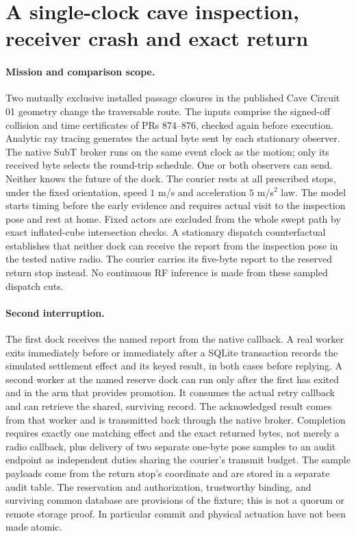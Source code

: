 \documentclass{article}
\begin{document}
\section*{A single-clock cave inspection, receiver crash and exact return}

\paragraph{Mission and comparison scope.}
Two mutually exclusive installed passage closures in the published Cave
Circuit 01 geometry change the traversable route. The inputs comprise the
signed-off collision and time certificates of PRs 874--876, checked
again before execution. Analytic ray tracing generates the actual byte
sent by each stationary observer. The native SubT broker runs on the same
event clock as the motion; only its received byte selects the round-trip
schedule. One or both observers can send. Neither knows the future of
the dock. The courier rests at all prescribed stops, under the fixed
orientation, speed $1$ m/s and acceleration $5$ m/s$^2$ law. The model
starts timing before the early evidence and requires actual visit to the
inspection pose and rest at home. Fixed actors are excluded from the
whole swept path by exact inflated-cube intersection checks. A stationary
dispatch counterfactual establishes that neither dock can receive the
report from the inspection pose in the tested native radio. The courier
carries its five-byte report to the reserved return stop instead.
No continuous RF inference is made from these sampled dispatch cuts.

\paragraph{Second interruption.}
The first dock receives the named report from the native callback. A
real worker exits immediately before or immediately after a SQLite
transaction records the simulated settlement effect and its keyed
result, in both cases before replying. A second worker at the named
reserve dock can run only after the first has exited and in the arm that
provides promotion. It consumes the actual retry callback and can
retrieve the shared, surviving record. The acknowledged result comes
from that worker and is transmitted back through the native broker.
Completion requires exactly one matching effect and the exact returned
bytes, not merely a radio callback, plus delivery of two separate
one-byte pose samples to an audit endpoint as independent duties
sharing the courier's transmit budget. The sample payloads come from
the return stop's coordinate and are stored in a separate audit table.
The reservation and authorization, trustworthy binding, and surviving
common database are provisions of the fixture; this is not a quorum or
remote storage proof. In particular commit and physical actuation have
not been made atomic.
\end{document}
